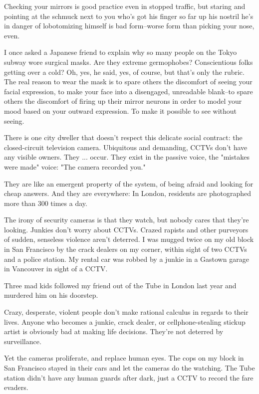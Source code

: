 Checking your mirrors is good practice even in stopped traffic, but
staring and pointing at the schmuck next to you who's got his
finger so far up his nostril he's in danger of lobotomizing himself
is bad form--worse form than picking your nose, even.

I once asked a Japanese friend to explain why so many people on the
Tokyo subway wore surgical masks. Are they extreme germophobes?
Conscientious folks getting over a cold? Oh, yes, he said, yes, of
course, but that's only the rubric. The real reason to wear the
mask is to spare others the discomfort of seeing your facial
expression, to make your face into a disengaged, unreadable
blank--to spare others the discomfort of firing up their mirror
neurons in order to model your mood based on your outward
expression. To make it possible to see without seeing.

There is one city dweller that doesn't respect this delicate social
contract: the closed-circuit television camera. Ubiquitous and
demanding, CCTVs don't have any visible owners. They ... occur.
They exist in the passive voice, the "mistakes were made" voice:
"The camera recorded you."

They are like an emergent property of the system, of being afraid
and looking for cheap answers. And they are everywhere: In London,
residents are photographed more than 300 times a day.

The irony of security cameras is that they watch, but nobody cares
that they're looking. Junkies don't worry about CCTVs. Crazed
rapists and other purveyors of sudden, senseless violence aren't
deterred. I was mugged twice on my old block in San Francisco by
the crack dealers on my corner, within sight of two CCTVs and a
police station. My rental car was robbed by a junkie in a Gastown
garage in Vancouver in sight of a CCTV.

Three mad kids followed my friend out of the Tube in London last
year and murdered him on his doorstep.

Crazy, desperate, violent people don't make rational calculus in
regards to their lives. Anyone who becomes a junkie, crack dealer,
or cellphone-stealing stickup artist is obviously bad at making
life decisions. They're not deterred by surveillance.

Yet the cameras proliferate, and replace human eyes. The cops on my
block in San Francisco stayed in their cars and let the cameras do
the watching. The Tube station didn't have any human guards after
dark, just a CCTV to record the fare evaders.

